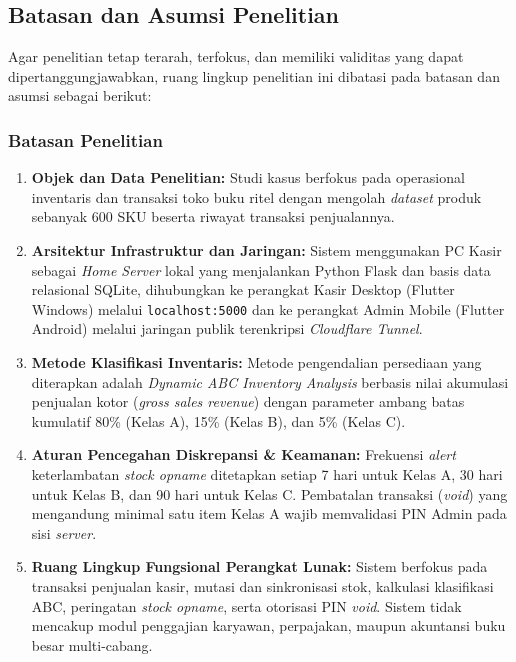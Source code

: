 \documentclass[11pt, a4paper]{article}
\begin{document}
\subsection{Batasan dan Asumsi Penelitian}
Agar penelitian tetap terarah, terfokus, dan memiliki validitas yang dapat dipertanggungjawabkan, ruang lingkup penelitian ini dibatasi pada batasan dan asumsi sebagai berikut:

\subsubsection{Batasan Penelitian}
\begin{enumerate}[label=\alph*.]
    \item \textbf{Objek dan Data Penelitian:} Studi kasus berfokus pada operasional inventaris dan transaksi toko buku ritel dengan mengolah \textit{dataset} produk sebanyak 600 SKU beserta riwayat transaksi penjualannya.
    \item \textbf{Arsitektur Infrastruktur dan Jaringan:} Sistem menggunakan PC Kasir sebagai \textit{Home Server} lokal yang menjalankan Python Flask dan basis data relasional SQLite, dihubungkan ke perangkat Kasir Desktop (Flutter Windows) melalui \texttt{localhost:5000} dan ke perangkat Admin Mobile (Flutter Android) melalui jaringan publik terenkripsi \textit{Cloudflare Tunnel}.
    \item \textbf{Metode Klasifikasi Inventaris:} Metode pengendalian persediaan yang diterapkan adalah \textit{Dynamic ABC Inventory Analysis} berbasis nilai akumulasi penjualan kotor (\textit{gross sales revenue}) dengan parameter ambang batas kumulatif 80\% (Kelas A), 15\% (Kelas B), dan 5\% (Kelas C).
    \item \textbf{Aturan Pencegahan Diskrepansi \& Keamanan:} Frekuensi \textit{alert} keterlambatan \textit{stock opname} ditetapkan setiap 7 hari untuk Kelas A, 30 hari untuk Kelas B, dan 90 hari untuk Kelas C. Pembatalan transaksi (\textit{void}) yang mengandung minimal satu item Kelas A wajib memvalidasi PIN Admin pada sisi \textit{server}.
    \item \textbf{Ruang Lingkup Fungsional Perangkat Lunak:} Sistem berfokus pada transaksi penjualan kasir, mutasi dan sinkronisasi stok, kalkulasi klasifikasi ABC, peringatan \textit{stock opname}, serta otorisasi PIN \textit{void}. Sistem tidak mencakup modul penggajian karyawan, perpajakan, maupun akuntansi buku besar multi-cabang.
\end{enumerate}
\end{document}

